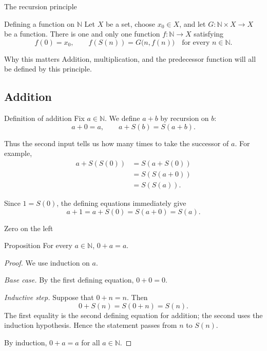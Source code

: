\documentclass[aspectratio=169,11pt]{beamer}
\newcommand{\N}{\mathbb N}
\newcommand{\suc}[1]{S(#1)}
\begin{document}
\begin{frame}{The recursion principle}
  \begin{block}{Defining a function on \(\N\)}
    Let \(X\) be a set, choose \(x_0\in X\), and let
    \(G\colon\N\times X\to X\) be a function.  There is one and only one function
    \(f\colon\N\to X\) satisfying
    \[
      f(0)=x_0,
      \qquad
      f(\suc n)=G\bigl(n,f(n)\bigr)
      \quad\text{for every }n\in\N.
    \]
  \end{block}

  \begin{alertblock}{Why this matters}
    Addition, multiplication, and the predecessor function will all be defined
    by this principle.
  \end{alertblock}
\end{frame}

\subsection{Addition}

\begin{frame}{Definition of addition}
  Fix \(a\in\N\).  We define \(a+b\) by recursion on \(b\):
  \[
    \boxed{a+0=a},
    \qquad
    \boxed{a+\suc b=\suc{a+b}}.
  \]

  Thus the second input tells us how many times to take the successor of \(a\).
  For example,
  \begin{align*}
    a+\suc{\suc 0}
      &=\suc{a+\suc 0}\\
      &=\suc{\suc{a+0}}\\
      &=\suc{\suc a}.
  \end{align*}

  Since \(1=\suc 0\), the defining equations immediately give
  \[
    a+1=a+\suc 0=\suc{a+0}=\suc a.
  \]
\end{frame}

\begin{frame}{Zero on the left}
  \begin{block}{Proposition}
    For every \(a\in\N\), \(0+a=a\).
  \end{block}

  \begin{proof}
    We use induction on \(a\).

    \emph{Base case.} By the first defining equation,
    \(0+0=0\).

    \emph{Inductive step.} Suppose that \(0+n=n\).  Then
    \[
      0+\suc n
        =\suc{0+n}
        =\suc n.
    \]
    The first equality is the second defining equation for addition; the
    second uses the induction hypothesis.  Hence the statement passes from
    \(n\) to \(\suc n\).

    By induction, \(0+a=a\) for all \(a\in\N\).
  \end{proof}
\end{frame}
\end{document}

